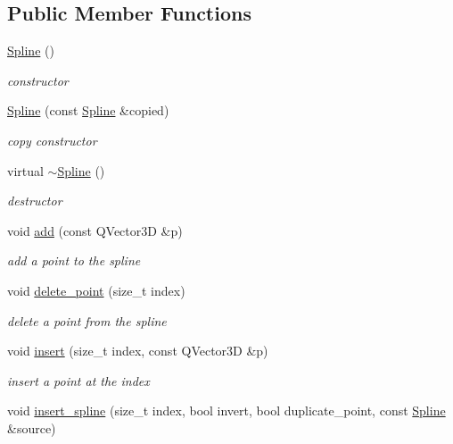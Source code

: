 \subsection*{Public Member Functions}
\begin{DoxyCompactItemize}
\item 
\hyperlink{classShipCAD_1_1Spline_a7ad84ea604562c7c9cb309b4e78e25c5}{Spline} ()
\begin{DoxyCompactList}\small\item\em constructor \end{DoxyCompactList}\item 
\hyperlink{classShipCAD_1_1Spline_a891b0c893b8124dca341680076854bff}{Spline} (const \hyperlink{classShipCAD_1_1Spline}{Spline} \&copied)
\begin{DoxyCompactList}\small\item\em copy constructor \end{DoxyCompactList}\item 
virtual \hyperlink{classShipCAD_1_1Spline_a20cddb0145346150b4ca30b63ef47c9b}{$\sim$\+Spline} ()
\begin{DoxyCompactList}\small\item\em destructor \end{DoxyCompactList}\item 
void \hyperlink{classShipCAD_1_1Spline_ac3d9f4514573be91b316413bf062791a}{add} (const Q\+Vector3D \&p)
\begin{DoxyCompactList}\small\item\em add a point to the spline \end{DoxyCompactList}\item 
void \hyperlink{classShipCAD_1_1Spline_a120c5530571f138daad61426053220f3}{delete\+\_\+point} (size\+\_\+t index)
\begin{DoxyCompactList}\small\item\em delete a point from the spline \end{DoxyCompactList}\item 
void \hyperlink{classShipCAD_1_1Spline_aa1ea6446e0b59d5cce88580242cd25b6}{insert} (size\+\_\+t index, const Q\+Vector3D \&p)
\begin{DoxyCompactList}\small\item\em insert a point at the index \end{DoxyCompactList}\item 
void \hyperlink{classShipCAD_1_1Spline_aa8e588b92d23c74bb6ec120624b49e54}{insert\+\_\+spline} (size\+\_\+t index, bool invert, bool duplicate\+\_\+point, const \hyperlink{classShipCAD_1_1Spline}{Spline} \&source)

\end{DoxyCompactItemize}

